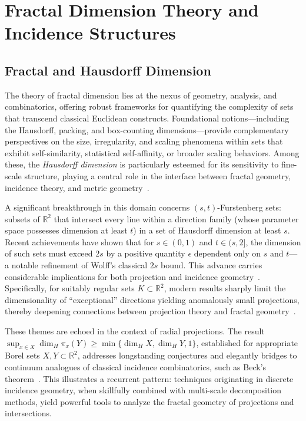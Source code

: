 \section{Fractal Dimension Theory and Incidence Structures}

\subsection{Fractal and Hausdorff Dimension}

The theory of fractal dimension lies at the nexus of geometry, analysis, and combinatorics, offering robust frameworks for quantifying the complexity of sets that transcend classical Euclidean constructs. Foundational notions—including the Hausdorff, packing, and box-counting dimensions—provide complementary perspectives on the size, irregularity, and scaling phenomena within sets that exhibit self-similarity, statistical self-affinity, or broader scaling behaviors. Among these, the \emph{Hausdorff dimension} is particularly esteemed for its sensitivity to fine-scale structure, playing a central role in the interface between fractal geometry, incidence theory, and metric geometry~\cite{ref68}.

A significant breakthrough in this domain concerns $(s, t)$-Furstenberg sets: subsets of $\mathbb{R}^2$ that intersect every line within a direction family (whose parameter space possesses dimension at least $t$) in a set of Hausdorff dimension at least $s$. Recent achievements have shown that for $s \in (0,1)$ and $t\in(s,2]$, the dimension of such sets must exceed $2s$ by a positive quantity $\epsilon$ dependent only on $s$ and $t$—a notable refinement of Wolff's classical $2s$ bound. This advance carries considerable implications for both projection and incidence geometry~\cite{ref68}. Specifically, for suitably regular sets $K \subset \mathbb{R}^2$, modern results sharply limit the dimensionality of ``exceptional'' directions yielding anomalously small projections, thereby deepening connections between projection theory and fractal geometry~\cite{ref68}.

These themes are echoed in the context of radial projections. The result $\sup_{x \in X} \dim_H \pi_x(Y) \geq \min\{ \dim_H X, \dim_H Y, 1 \}$, established for appropriate Borel sets $X, Y \subset \mathbb{R}^2$, addresses longstanding conjectures and elegantly bridges to continuum analogues of classical incidence combinatorics, such as Beck's theorem~\cite{ref92}. This illustrates a recurrent pattern: techniques originating in discrete incidence geometry, when skillfully combined with multi-scale decomposition methods, yield powerful tools to analyze the fractal geometry of projections and intersections.

